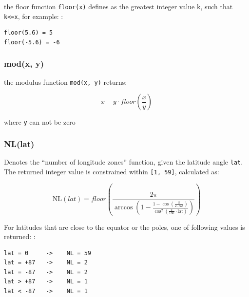 the floor function \texttt{floor(x)} defines as the greatest integer
value k, such that \texttt{k\textless{}=x}, for example: :

\begin{verbatim}
floor(5.6) = 5
floor(-5.6) = -6
\end{verbatim}

\subsubsection{mod(x, y)}\label{modx-y}

the modulus function \texttt{mod(x,\ y)} returns:

\begin{equation}
  x - y \cdot floor(\frac{x}{y})
\end{equation}

where \texttt{y} can not be zero

\subsubsection{NL(lat)}\label{nllat}

Denotes the ``number of longitude zones'' function, given the latitude
angle \texttt{lat}. The returned integer value is constrained within
\texttt{{[}1,\ 59{]}}, calculated as:

\begin{equation}
  \text{NL}(lat) = floor \left( \frac{2 \pi}{\arccos(1 - \frac{1-\cos(\frac{\pi}{2 \cdot \text{NZ}})}{\cos^2(\frac{\pi}{180} \cdot \text{lat})}) } \right)
\end{equation}

For latitudes that are close to the equator or the poles, one of
following values is returned: :

\begin{verbatim}
lat = 0     ->    NL = 59
lat = +87   ->    NL = 2
lat = -87   ->    NL = 2
lat > +87   ->    NL = 1
lat < -87   ->    NL = 1
\end{verbatim}
